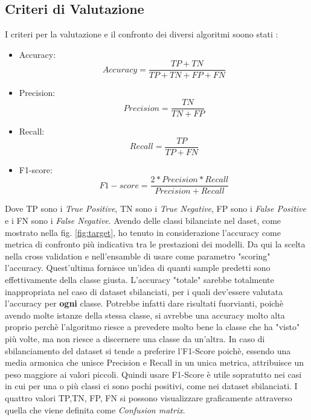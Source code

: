 \subsection{Criteri di Valutazione}\label{ssec: Criteria}

I criteri per la valutazione e il confronto dei diversi algoritmi soono stati : 
\begin{itemize}\label{eq: confusion matrix}
    \item Accuracy: \begin{equation}
        Accuracy= \frac{TP+TN}{TP+TN+FP+FN}
    \end{equation}
    \item Precision: \begin{equation}
        Precision= \frac{TN}{TN+FP}
    \end{equation}
    \item Recall: \begin{equation}
        Recall= \frac{TP}{TP+FN}
    \end{equation}
    \item F1-score: \begin{equation}
        F1-score= \frac{2 *  Precision * Recall}{Precision + Recall}
    \end{equation}
    
\end{itemize}
Dove TP sono i \textit{True Positive}, TN sono i \textit{True Negative}, FP sono i \textit{False Positive} e i FN sono i \textit{False Negative}. 
\newline Avendo delle classi bilanciate nel daset, come mostrato nella fig. \ref{fig:target}, ho tenuto in considerazione l'accuracy come metrica di confronto più indicativa tra le prestazioni dei modelli. Da qui la scelta nella cross validation e nell'ensamble di usare come parametro "scoring" l'accuracy. Quest'ultima fornisce un'idea di quanti sample predetti sono effettivamente della classe giusta. L'accuracy "totale" sarebbe totalmente inappropriata nel caso di dataset sbilanciati, per i quali dev'essere valutata l'accuracy per \textbf{ogni} classe. Potrebbe infatti dare risultati fuorvianti, poichè avendo molte istanze della stessa classe, si avrebbe una accuracy molto alta proprio perchè l'algoritmo riesce a prevedere molto bene la classe che ha "visto" più volte, ma non riesce a discernere una classe da un'altra. In caso di sbilanciamento del dataset si tende a preferire l'F1-Score poichè, essendo una media armonica che unisce Precision e Recall in un unica metrica, attribuisce un peso maggiore ai valori piccoli. Quindi usare F1-Score è utile sopratutto nei casi in cui per una o più classi ci sono pochi positivi, come nei dataset sbilanciati. 
\newline I quattro valori \textsc{TP,TN, FP, FN} si possono visualizzare graficamente attraverso quella che viene definita come \emph{Confusion matrix}.

